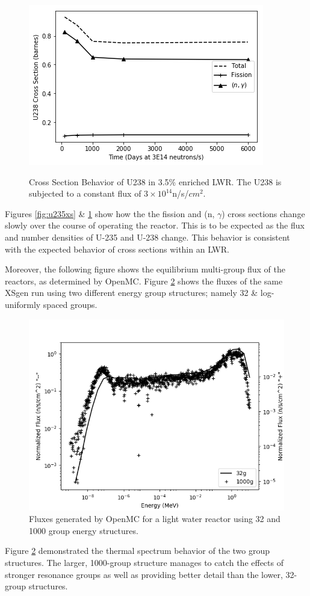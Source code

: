 \documentclass{article}
\begin{document}
\begin{figure}
\caption{Cross Section Behavior of U238 in 3.5\% enriched LWR. The U238 is subjected to a constant flux of $3\times10^{14}$n/s/$cm^2$.}
\includegraphics[scale=0.8]{U238xs.png}
\label{fig:u238xs}
\end{figure}

Figures \ref{fig:u235xs} \& \ref{fig:u238xs} show how the the fission and (n, $\gamma$)
cross sections change slowly over the course of operating the reactor. This is to be
expected as the flux and number densities of U-235 and U-238 change. 
This behavior is consistent with the expected behavior of cross sections within an LWR.

Moreover, the following figure shows the equilibrium multi-group flux of the reactors, as
determined by OpenMC.
Figure \ref{fig:32g} shows the fluxes of the same XSgen run using two different energy group
structures; namely 32 \& log-uniformly spaced groups.
\begin{figure}[h]
  \center
  \includegraphics[scale=0.7]{fluxes.png}
  \caption{Fluxes generated by OpenMC for a light water reactor using 32 and 1000 group energy structures.}
  \label{fig:32g}
\end{figure}
Figure \ref{fig:32g} demonstrated the thermal spectrum behavior of the two group structures.
The larger, 1000-group structure manages to catch the effects of stronger resonance groups
as well as providing better detail than the lower, 32-group structures.
\end{document}
